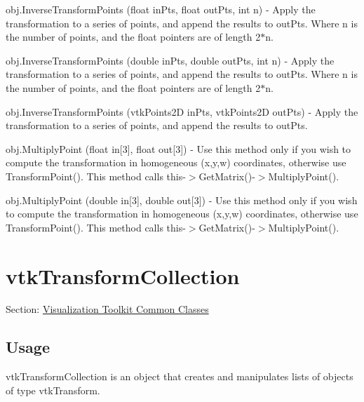 \begin{DoxyItemize}
\item {\ttfamily obj.\-Inverse\-Transform\-Points (float in\-Pts, float out\-Pts, int n)} -\/ Apply the transformation to a series of points, and append the results to out\-Pts. Where n is the number of points, and the float pointers are of length 2$\ast$n.  
\item {\ttfamily obj.\-Inverse\-Transform\-Points (double in\-Pts, double out\-Pts, int n)} -\/ Apply the transformation to a series of points, and append the results to out\-Pts. Where n is the number of points, and the float pointers are of length 2$\ast$n.  
\item {\ttfamily obj.\-Inverse\-Transform\-Points (vtk\-Points2\-D in\-Pts, vtk\-Points2\-D out\-Pts)} -\/ Apply the transformation to a series of points, and append the results to out\-Pts.  
\item {\ttfamily obj.\-Multiply\-Point (float in\mbox{[}3\mbox{]}, float out\mbox{[}3\mbox{]})} -\/ Use this method only if you wish to compute the transformation in homogeneous (x,y,w) coordinates, otherwise use Transform\-Point(). This method calls this-\/$>$Get\-Matrix()-\/$>$Multiply\-Point().  
\item {\ttfamily obj.\-Multiply\-Point (double in\mbox{[}3\mbox{]}, double out\mbox{[}3\mbox{]})} -\/ Use this method only if you wish to compute the transformation in homogeneous (x,y,w) coordinates, otherwise use Transform\-Point(). This method calls this-\/$>$Get\-Matrix()-\/$>$Multiply\-Point().  
\end{DoxyItemize}\hypertarget{vtkcommon_vtktransformcollection}{}\section{vtk\-Transform\-Collection}\label{vtkcommon_vtktransformcollection}
Section\-: \hyperlink{sec_vtkcommon}{Visualization Toolkit Common Classes} \hypertarget{vtkwidgets_vtkxyplotwidget_Usage}{}\subsection{Usage}\label{vtkwidgets_vtkxyplotwidget_Usage}
vtk\-Transform\-Collection is an object that creates and manipulates lists of objects of type vtk\-Transform.

